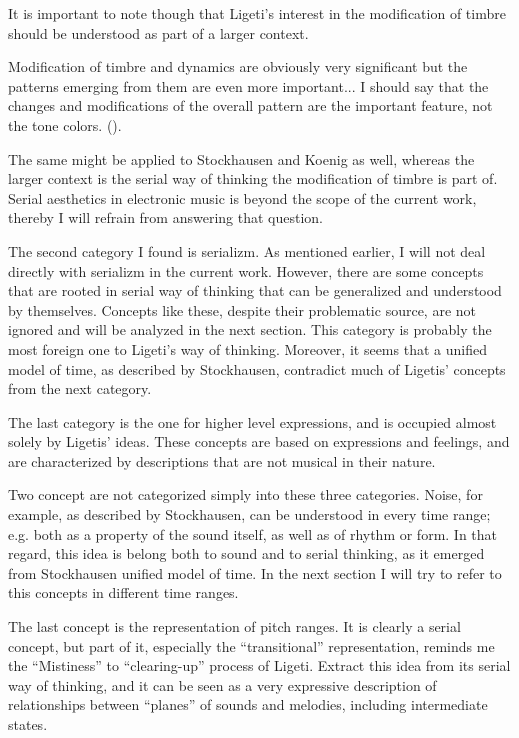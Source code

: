\documentclass[a4paper,11pt]{article}
\newenvironment{MyShadequote}[1][]
    {\begin{mdframed}[style=MyShadeQuoteStyle,#1]}
    {\end{mdframed}}
\begin{document}
It is important to note though that Ligeti's interest in the modification of timbre should be understood as part of a larger context.

\begin{MyShadequote}
  Modification of timbre and dynamics are obviously very significant but the patterns emerging from them are even more important...
  I should say that the changes and modifications of the overall pattern are the important feature, not the tone colors. (\cite[p. 39]{varnai}).
\end{MyShadequote}

The same might be applied to Stockhausen and Koenig as well, whereas the larger context is the serial way of thinking the modification of timbre is part of.
Serial aesthetics in electronic music is beyond the scope of the current work, thereby I will refrain from answering that question.

The second category I found is serializm.
As mentioned earlier, I will not deal directly with serializm in the current work.
However, there are some concepts that are rooted in serial way of thinking that can be generalized and understood by themselves.
Concepts like these, despite their problematic source, are not ignored and will be analyzed in the next section.
This category is probably the most foreign one to Ligeti's way of thinking.
Moreover, it seems that a unified model of time, as described by Stockhausen, contradict much of Ligetis' concepts from the next category.

The last category is the one for higher level expressions, and is occupied almost solely by Ligetis' ideas.
These concepts are based on expressions and feelings, and are characterized by descriptions that are not musical in their nature.

Two concept are not categorized simply into these three categories.
Noise, for example, as described by Stockhausen, can be understood in every time range;
e.g. both as a property of the sound itself, as well as of rhythm or form.
In that regard, this idea is belong both to sound and to serial thinking, as it emerged from Stockhausen unified model of time.
In the next section I will try to refer to this concepts in different time ranges.

The last concept is the representation of pitch ranges.
It is clearly a serial concept, but part of it, especially the ``transitional'' representation, reminds me the ``Mistiness'' to ``clearing-up'' process of Ligeti.
Extract this idea from its serial way of thinking, and it can be seen as a very expressive description of relationships between ``planes'' of sounds and melodies, including intermediate states.
\end{document}
